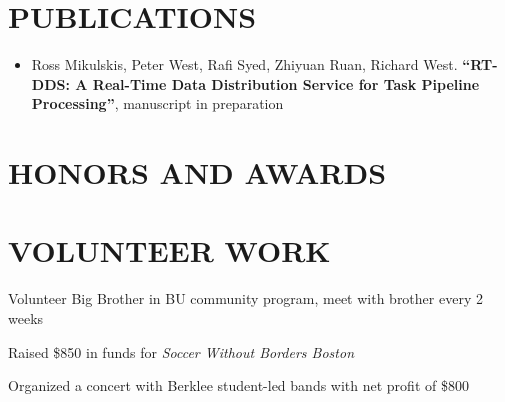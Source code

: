 \documentclass[10pt]{article}
\begin{document}
\begin{FlushLeft}
  \section{PUBLICATIONS}
  \begin{itemize}
  \item Ross Mikulskis, Peter West, Rafi Syed, Zhiyuan Ruan, Richard West. \textbf{``RT-DDS: A Real-Time Data Distribution Service for Task Pipeline Processing''},
manuscript in preparation    
  \end{itemize}
  
  \section{HONORS AND AWARDS}
  \vspace{-0.75em}
  \begin{itemize}{
    \item {}
    \item {}
    \item {}
    \item {}      
    }
  \end{itemize}
  \section{VOLUNTEER WORK}

  \begin{itemize}{
    \item Volunteer Big Brother in BU community program, meet with brother every 2 weeks
    }
  \end{itemize}

  
  \begin{itemize}{
      
    \item Raised \$850 in funds for \textit{Soccer Without Borders Boston}
    }
  \end{itemize}
  
  \begin{itemize}{
    \item Organized a concert with Berklee student-led bands with net profit of \$800
    }
  \end{itemize}
  

\end{FlushLeft}
\end{document}
